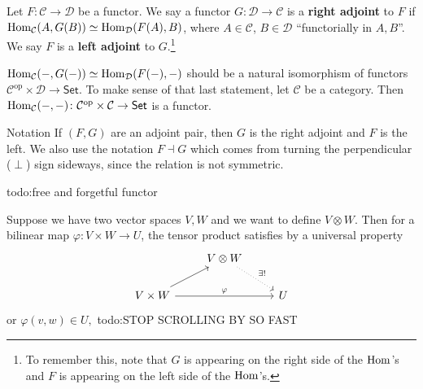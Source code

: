 \begin{definition}[]
    Let $F \colon \mathcal{C}  \to \mathcal{D} $ be a functor. We say a functor $G \colon \mathcal{D}  \to \mathcal{C} $ is a \textbf{right adjoint} to $F$ if $\operatorname{Hom} _{\mathcal{C} }(A, G(B))\simeq \operatorname{Hom} _{\mathcal{D} }(F(A),B)$, where $A \in \mathcal{C} $, $B \in \mathcal{D} $ ``functorially in $A,B$''. We say $F$ is a \textbf{left adjoint} to $G$.\footnote{To remember this, note that $G$ is appearing on the right side of the $\operatorname{Hom}$'s and $F$ is appearing on the left side of the $\operatorname{Hom}$'s.}
\end{definition}
$\operatorname{Hom} _{\mathcal{C} }(-,G(-))\simeq  \operatorname{Hom} _{\mathcal{D} }(F(-),-)$ should be a natural isomorphism of functors $\mathcal{C} ^{\mathrm{op}}\times \mathcal{D} \to \mathsf{Set} $. To make sense of that last statement, let $\mathcal{C} $ be a category. Then $\operatorname{Hom} _{\mathcal{C} }(-,-) \colon \mathcal{C} ^{\mathrm{op}} \times \mathcal{C} \to \mathsf{Set} $ is a functor.

\begin{namedthing}{Notation} 
If $(F,G)$ are an adjoint pair, then $G$ is the right adjoint and $F$ is the left. We also use the notation $F\dashv G$ which comes from turning the perpendicular ($\perp$) sign sideways, since the relation is not symmetric.
\end{namedthing}
    
\begin{example}
    {\color{red}todo:free and forgetful functor} 
\end{example}
\begin{example}
Suppose we have two vector spaces $V,W$ and we want to define $V \otimes W$. Then for a bilinear map $\varphi  \colon V \times W \to U$, the tensor product satisfies by a universal property \[
\begin{tikzcd}
                                           & V\otimes W \arrow[rd, "\exists!", dotted] &   \\
V\times W \arrow[ru] \arrow[rr, "\varphi"] &                                           & U
\end{tikzcd}
\]  or $\varphi (v,w) \in U, $ {\color{red}todo:STOP SCROLLING BY SO FAST} 
\end{example}
